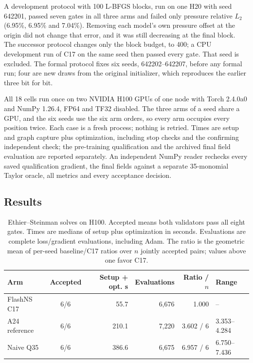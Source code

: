 \documentclass[11pt]{article}
\begin{document}
A development protocol with 100 L-BFGS blocks, run on one H20 with seed
642201, passed seven gates in all three arms and failed only pressure
relative $L_2$ (6.95\%, 6.95\% and 7.04\%). Removing each model's own
pressure offset at the origin did not change that error, and it was still
decreasing at the final block. The successor protocol changes only the
block budget, to 400; a CPU development run of C17 on the same seed then
passed every gate. That seed is excluded. The formal protocol fixes six
seeds, 642202--642207, before any formal run; four are new draws from the
original initializer, which reproduces the earlier three bit for bit.

All 18 cells run once on two NVIDIA H100 GPUs of one node with Torch
2.4.0a0 and NumPy 1.26.4, FP64 and TF32 disabled. The three arms of a
seed share a GPU, and the six seeds use the six arm orders, so every arm
occupies every position twice. Each case is a fresh process; nothing is
retried. Times are setup and graph capture plus optimization, including
stop checks and the confirming independent check; the pre-training
qualification and the archived final field evaluation are reported
separately. An independent NumPy reader rechecks every saved qualification
gradient, the final fields against a separate 35-monomial Taylor oracle,
all metrics and every acceptance decision.

\subsection{Results}
\begin{table}[htbp]\centering\small
\setlength{\tabcolsep}{4pt}
\caption{Ethier--Steinman solves on H100. Accepted means both validators pass all eight gates. Times are medians of setup plus optimization in seconds. Evaluations are complete loss/gradient evaluations, including Adam. The ratio is the geometric mean of per-seed baseline/C17 ratios over $n$ jointly accepted pairs; values above one favor C17.}
\label{tab:ethier}
\begin{tabular}{lcrrrl}\toprule
Arm & Accepted & Setup + opt. s & Evaluations & Ratio / $n$ & Range\\\midrule
FlashNS C17 & 6/6 & 55.7 & 6,676 & 1.000 & --\\
A24 reference & 6/6 & 210.1 & 7,220 & 3.602 / 6 & 3.353--4.284\\
Naive Q35 & 6/6 & 386.6 & 6,675 & 6.957 / 6 & 6.750--7.436\\
\bottomrule\end{tabular}
\end{table}
\end{document}
